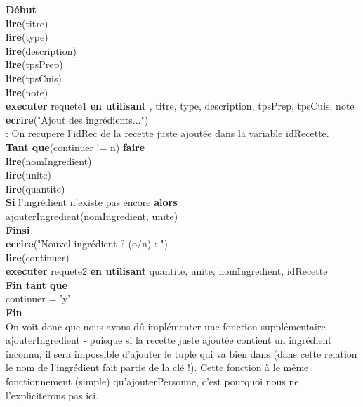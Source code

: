 \documentclass[a4paper,10pt]{report}
\begin{document}
\textbf{Début}\\
	\indent\indent\textbf{lire}(titre)\\
	\indent\indent\textbf{lire}(type)\\
	\indent\indent\textbf{lire}(description)\\
	\indent\indent\textbf{lire}(tpsPrep)\\
	\indent\indent\textbf{lire}(tpsCuis)\\
	\indent\indent\textbf{lire}(note)\\
	\indent\indent\textbf{executer} requete1 \textbf{en utilisant} , titre, type, description, tpsPrep, tpsCuis, note\\
	\indent\indent\textbf{ecrire}("Ajout des ingrédients...")\\
	\indent\indent{} : On recupere l'idRec de la recette juste ajoutée dans la variable idRecette.\\
	\indent\indent\textbf{Tant que}(continuer != n) \textbf{faire}\\
		\indent\indent\indent\textbf{lire}(nomIngredient)\\
		\indent\indent\indent\textbf{lire}(unite)\\
		\indent\indent\indent\textbf{lire}(quantite)\\
		\indent\indent\indent \textbf{Si} l'ingrédient n'existe pas encore \textbf{alors}\\
			\indent\indent\indent\indent ajouterIngredient(nomIngredient, unite) \\
		\indent\indent\indent \textbf{Finsi} \\
		\indent\indent\indent\textbf{ecrire}("Nouvel ingrédient ? (o/n) : ")\\
		\indent\indent\indent\textbf{lire}(continuer)\\
		\indent\indent\indent\textbf{executer} requete2 \textbf{en utilisant} quantite, unite, nomIngredient, idRecette\\
	\indent\indent\textbf{Fin tant que}\\
	\indent\indent continuer = 'y'\\
	\indent\textbf{Fin}\\
	
	On voit donc que nous avons dû implémenter une fonction supplémentaire - ajouterIngredient - puisque si la recette juste ajoutée contient un ingrédient inconnu, il sera impossible d'ajouter le tuple qui va bien dans  (dans cette relation le nom de l'ingrédient fait partie de la clé !). Cette fonction à le même fonctionnement (simple) qu'ajouterPersonne, c'est pourquoi nous ne l'expliciterons pas ici.\\
\end{document}
